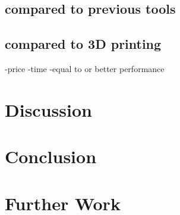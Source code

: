 \documentclass[a4paper]{report}
\begin{document}
\section{compared to previous tools}

\section{compared to 3D printing}
-price
-time
-equal to or better performance

\chapter{Discussion}\label{Discussion}


\chapter{Conclusion} \label{Conclusion}

\chapter{Further Work} \label{Further Work}

\appendix



%
%
\printbibliography
\end{document}
